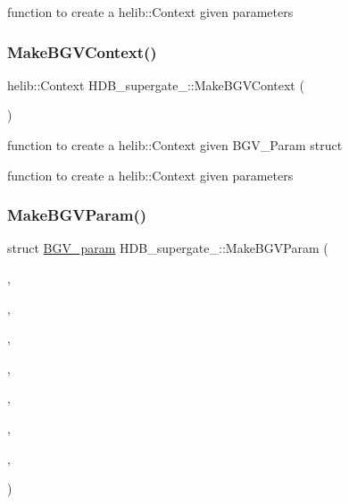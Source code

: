 function to create a helib\+::\+Context given parameters \mbox{\label{namespaceHDB__supergate___a8a0616d8c5b340d3ff4b663fa841fc51}} 
\subsubsection{\texorpdfstring{Make\+B\+G\+V\+Context()}{MakeBGVContext()}\hspace{0.1cm}{\footnotesize\ttfamily [2/2]}}
{\footnotesize\ttfamily helib\+::\+Context H\+D\+B\+\_\+supergate\+\_\+\+::\+Make\+B\+G\+V\+Context (\begin{DoxyParamCaption}\item[{const struct \hyperlink{structHDB__supergate___1_1BGV__param}{B\+G\+V\+\_\+param}}]{ }\end{DoxyParamCaption})}

function to create a helib\+::\+Context given B\+G\+V\+\_\+\+Param struct

function to create a helib\+::\+Context given parameters \mbox{\label{namespaceHDB__supergate___affa422b55e184c2fd69134364e309fbb}} 
\subsubsection{\texorpdfstring{Make\+B\+G\+V\+Param()}{MakeBGVParam()}}
{\footnotesize\ttfamily struct \hyperlink{structHDB__supergate___1_1BGV__param}{B\+G\+V\+\_\+param} H\+D\+B\+\_\+supergate\+\_\+\+::\+Make\+B\+G\+V\+Param (\begin{DoxyParamCaption}\item[{long}]{,  }\item[{long}]{,  }\item[{long}]{,  }\item[{long}]{,  }\item[{long}]{,  }\item[{long}]{,  }\item[{long}]{,  }\item[{long}]{ }\end{DoxyParamCaption})}

